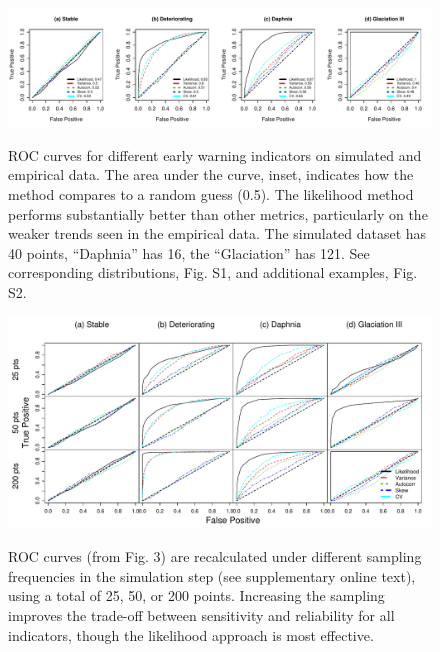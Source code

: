 \documentclass{pnastwo}
\begin{document}
 \begin{figure}
   \begin{center}
     \includegraphics[width=\linewidth]{Fig3.pdf}
     \label{fig3}
     \caption{ROC curves for different early warning indicators on simulated and empirical data.  The area under the curve, inset, indicates how the method compares to a random guess (0.5).  The likelihood method performs substantially better than other metrics, particularly on the weaker trends seen in the empirical data. The simulated dataset has 40 points, ``Daphnia'' has 16, the ``Glaciation'' has 121. See corresponding distributions, Fig. S1, and additional examples, Fig. S2.}
  \end{center}
 \end{figure}


 \begin{figure}
   \begin{center}
     \includegraphics[width=\linewidth]{Fig4.pdf}
     \label{fig4}
     \caption{ROC curves (from Fig. 3) are recalculated under different sampling frequencies in the simulation step (see supplementary online text), using a total of 25, 50, or 200 points.  Increasing the sampling improves the trade-off between sensitivity and reliability for all indicators, though the likelihood approach is most effective.} 
  \end{center}
 \end{figure}



\end{document}
